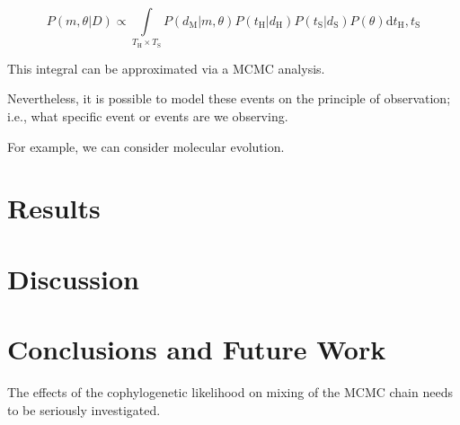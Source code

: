 \documentclass[12pt,letterpaper]{article}
\begin{document}
\begin{equation}
P\left(m,\theta|D\right) \propto \int\limits_{T_\textrm{H} \times T_\textrm{S}}  P\left(d_\textrm{M}|m, \theta\right) P\left(t_\textrm{H}|d_\textrm{H}\right) P\left(t_\textrm{S}|d_\textrm{S}\right) P\left(\theta\right) \textrm{d} t_\textrm{H},t_\textrm{S} 
\end{equation}

This integral can be approximated via a \ac{MCMC} analysis.

Nevertheless, it is possible to model these events on the principle of observation; i.e., what specific event or events are we observing.

For example, we can consider molecular evolution.

\section*{Results}

\section*{Discussion}

\section*{Conclusions and Future Work}

The effects of the cophylogenetic likelihood on mixing of the MCMC chain needs to be seriously investigated.

\printbibliography
\end{document}
